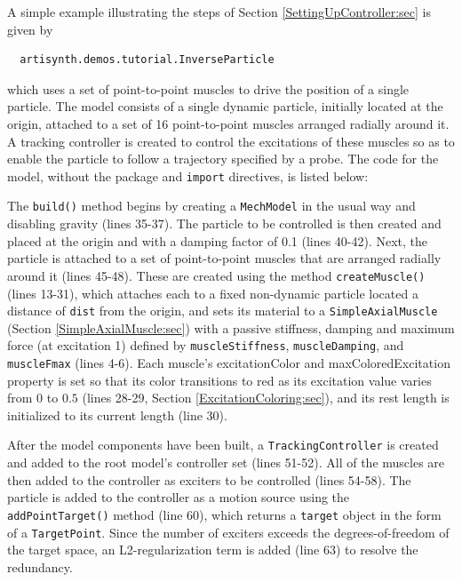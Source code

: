 A simple example illustrating the steps of
Section \ref{SettingUpController:sec} is given by
%
\begin{verbatim}
  artisynth.demos.tutorial.InverseParticle
\end{verbatim}
%
which uses a set of point-to-point muscles to drive the position of a single
particle. The model consists of a single dynamic particle, initially located at
the origin, attached to a set of 16 point-to-point muscles arranged radially
around it. A tracking controller is created to control the excitations of these
muscles so as to enable the particle to follow a trajectory specified by a
probe. The code for the model, without the package and {\tt import} directives, is
listed below:
%
\lstset{numbers=left}
\iflatexml

\else

\fi
\lstset{numbers=none}
%

The {\tt build()} method begins by creating a {\tt MechModel} in the usual way
and disabling gravity (lines 35-37). The particle to be controlled is then
created and placed at the origin and with a damping factor of 0.1 (lines
40-42). Next, the particle is attached to a set of point-to-point muscles that
are arranged radially around it (lines 45-48). These are created using the
method {\tt createMuscle()} (lines 13-31), which attaches each to a fixed
non-dynamic particle located a distance of {\tt dist} from the origin, and sets
its material to a {\tt SimpleAxialMuscle} (Section \ref{SimpleAxialMuscle:sec})
with a passive stiffness, damping and maximum force (at excitation 1) defined
by {\tt muscleStiffness}, {\tt muscleDamping}, and {\tt muscleFmax} (lines
4-6). Each muscle's {\sf excitationColor} and {\sf maxColoredExcitation}
property is set so that its color transitions to red as its excitation value
varies from $0$ to $0.5$ (lines 28-29, Section \ref{ExcitationColoring:sec}),
and its rest length is initialized to its current length (line 30).

After the model components have been built, a {\tt TrackingController} is
created and added to the root model's controller set (lines 51-52).  All of the
muscles are then added to the controller as exciters to be controlled (lines
54-58). The particle is added to the controller as a motion source using the
{\tt addPointTarget()} method (line 60), which returns a {\tt target} object
in the form of a {\tt TargetPoint}. Since the number of exciters exceeds the
degrees-of-freedom of the target space, an L2-regularization term is added
(line 63) to resolve the redundancy.

